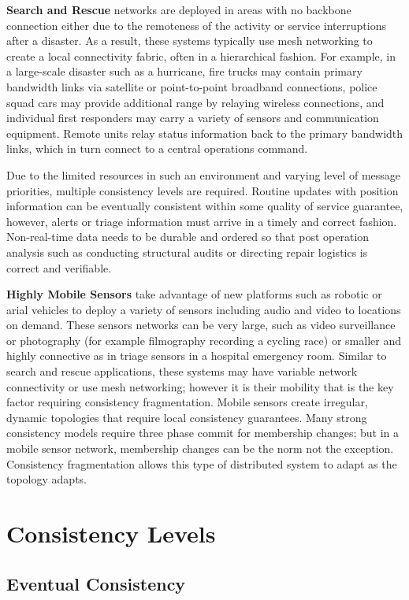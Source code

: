\documentclass[letterpaper,twocolumn,10pt]{article}
\begin{document}
\textbf{Search and Rescue} networks are deployed in areas with no backbone connection either due to the remoteness of the activity or service interruptions after a disaster. As a result, these systems typically use mesh networking to create a local connectivity fabric, often in a hierarchical fashion. For example, in a large-scale disaster such as a hurricane, fire trucks may contain primary bandwidth links via satellite or point-to-point broadband connections, police squad cars may provide additional range by relaying wireless connections, and individual first responders may carry a variety of sensors and communication equipment. Remote units relay status information back to the primary bandwidth links, which in turn connect to a central operations command.

Due to the limited resources in such an environment and varying level of message priorities, multiple consistency levels are required. Routine updates with position information can be eventually consistent within some quality of service guarantee, however, alerts or triage information must arrive in a timely and correct fashion. Non-real-time data needs to be durable and ordered so that post operation analysis such as conducting structural audits or directing repair logistics is correct and verifiable.

\textbf{Highly Mobile Sensors} take advantage of new platforms such as robotic or arial vehicles to deploy a variety of sensors including audio and video to locations on demand. These sensors networks can be very large, such as video surveillance or photography (for example filmography recording a cycling race) or smaller and highly connective as in triage sensors in a hospital emergency room. Similar to search and rescue applications, these systems may have variable network connectivity or use mesh networking; however it is their mobility that is the key factor requiring consistency fragmentation. Mobile sensors create irregular, dynamic topologies that require local consistency guarantees. Many strong consistency models require three phase commit for membership changes; but in a mobile sensor network, membership changes can be the norm not the exception. Consistency fragmentation allows this type of distributed system to adapt as the topology adapts.  

\section{Consistency Levels}

\subsection{Eventual Consistency}
\end{document}
